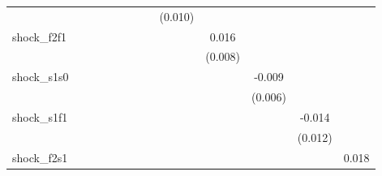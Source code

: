 {\begin{tabular}{l*{12}{c}}
            &                     &                     &                     &                     &                     &                     &                     &     (0.010)         &                     &                     &                     &                     \\
\addlinespace
shock\_f2f1  &                     &                     &                     &                     &                     &                     &                     &                     &       0.016\sym{*}  &                     &                     &                     \\
            &                     &                     &                     &                     &                     &                     &                     &                     &     (0.008)         &                     &                     &                     \\
\addlinespace
shock\_s1s0  &                     &                     &                     &                     &                     &                     &                     &                     &                     &      -0.009         &                     &                     \\
            &                     &                     &                     &                     &                     &                     &                     &                     &                     &     (0.006)         &                     &                     \\
\addlinespace
shock\_s1f1  &                     &                     &                     &                     &                     &                     &                     &                     &                     &                     &      -0.014         &                     \\
            &                     &                     &                     &                     &                     &                     &                     &                     &                     &                     &     (0.012)         &                     \\
\addlinespace
shock\_f2s1  &                     &                     &                     &                     &                     &                     &                     &                     &                     &                     &                     &       0.018\sym{**} \\

\end{tabular}}
